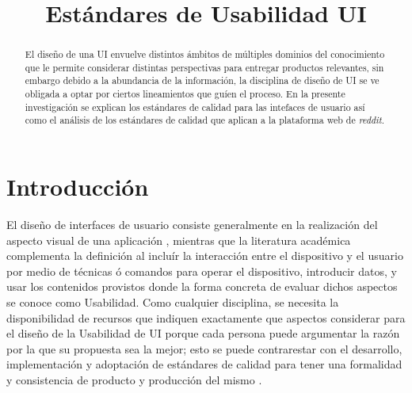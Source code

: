 \title{Estándares de Usabilidad UI}

\author{
}

\maketitle

\begin{abstract}
El diseño de una UI envuelve distintos ámbitos de múltiples dominios del conocimiento
que le permite considerar distintas perspectivas para entregar productos relevantes, sin embargo
debido a la abundancia de la información, la disciplina de diseño de UI se ve obligada a optar
por ciertos lineamientos que guíen el proceso. En la presente investigación se explican 
los estándares de calidad para las intefaces de usuario así como el análisis de los 
estándares de calidad que aplican a la plataforma web de \emph{reddit}.
\end{abstract}

\section{Introducción}
El diseño de interfaces de usuario consiste generalmente en la realización del aspecto
visual de una aplicación \cite{tutorialspoint-2021,geeksforgeeks-2022,unknown-author-no-dateA},
mientras que la literatura académica \cite{sharma-2021} complementa la definición
al incluír la interacción entre el dispositivo y el usuario por medio de técnicas 
ó comandos para operar el dispositivo, introducir datos, y usar los contenidos provistos
donde la forma concreta de evaluar dichos aspectos se conoce como Usabilidad.
Como cualquier disciplina, se necesita la disponibilidad de recursos que indiquen exactamente
que aspectos considerar para el diseño de la Usabilidad de UI porque cada persona puede argumentar la razón
por la que su propuesta sea la mejor; esto se puede contrarestar con el desarrollo, implementación
y adoptación de estándares de calidad para tener una formalidad y consistencia de producto y producción
del mismo . %

